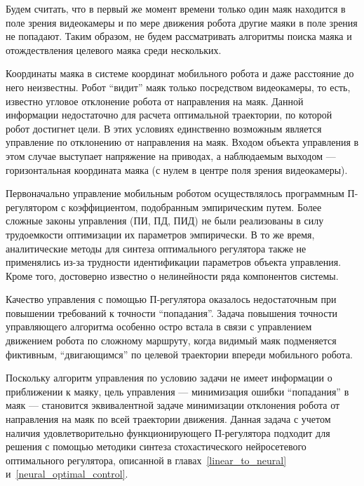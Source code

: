 Будем считать, что в первый же момент времени только один маяк
находится в поле зрения видеокамеры и по мере движения робота другие
маяки в поле зрения не попадают.  Таким образом, не будем
рассматривать алгоритмы поиска маяка и отождествления целевого маяка
среди нескольких.

Координаты маяка в системе координат мобильного робота и даже
расстояние до него неизвестны.  Робот ``видит'' маяк только
посредством видеокамеры, то есть, известно угловое отклонение робота
от направления на маяк.  Данной информации недостаточно для расчета
оптимальной траектории, по которой робот достигнет цели.  В этих
условиях единственно возможным является управление по отклонению от
направления на маяк.  Входом объекта управления в этом случае
выступает напряжение на приводах, а наблюдаемым выходом ---
горизонтальная координата маяка (с нулем в центре поля зрения
видеокамеры).

Первоначально управление мобильным роботом осуществлялось программным
П-ре\-гу\-ля\-то\-ром с коэффициентом, подобранным эмпирическим путем.
Более сложные законы управления (ПИ, ПД, ПИД) не были реализованы в
силу трудоемкости оптимизации их параметров эмпирически.  В то же
время, аналитические методы для синтеза оптимального регулятора также
не применялись из-за трудности идентификации параметров объекта
управления.  Кроме того, достоверно известно о нелинейности ряда
компонентов системы.

Качество управления с помощью П-регулятора оказалось недостаточным при
повышении требований к точности ``попадания''.  Задача повышения
точности управляющего алгоритма особенно остро встала в связи с
управлением движением робота по сложному маршруту, когда видимый маяк
подменяется фиктивным, ``двигающимся'' по целевой траектории впереди
мобильного робота.

Поскольку алгоритм управления по условию задачи не имеет информации о
приближении к маяку, цель управления --- минимизация ошибки
``попадания'' в маяк --- становится эквивалентной задаче минимизации
отклонения робота от направления на маяк по всей траектории движения.
Данная задача с учетом наличия удовлетворительно функционирующего
П-регулятора подходит для решения с помощью методики синтеза
стохастического нейросетевого оптимального регулятора, описанной
в главах~\ref{linear_to_neural} и~\ref{neural_optimal_control}.


